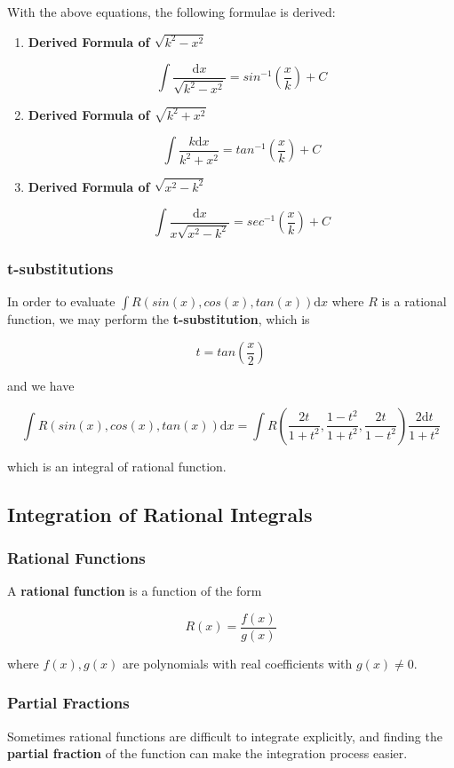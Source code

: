 \documentclass[a4paper,12pt]{article}
\newcommand{\s}{\vspace{1mm}}
\newcommand{\n}{\vspace{3mm}}
\newcommand{\diff}{\mathrm{d}}
\newenvironment{alist}{ %
\begin{enumerate}[label=(\alph*)]
}{
\end{enumerate}
}
\begin{document}
With the above equations, the following formulae is derived:

\begin{alist}
  \item \textbf{Derived Formula of $\sqrt{k^{2}-x^{2}}$}

  $$\int\frac{\diff x}{\sqrt{k^{2}-x^{2}}}=sin^{-1}(\frac{x}{k})+C$$

  \item \textbf{Derived Formula of $\sqrt{k^{2}+x^{2}}$}

  $$\int\frac{k\diff x}{k^{2}+x^{2}}=tan^{-1}(\frac{x}{k})+C$$

  \item \textbf{Derived Formula of $\sqrt{x^{2}-k^{2}}$}

  $$\int\frac{\diff x}{x\sqrt{x^{2}-k^{2}}}=sec^{-1}(\frac{x}{k})+C$$
\end{alist}

\subsubsection{t-substitutions}
In order to evaluate $\int R(sin(x),cos(x),tan(x))\diff x$ where $R$ is a rational function, we may perform the \textbf{t-substitution}, which is

$$t=tan\left( \frac{x}{2}\right)$$\s

and we have

$$\int R(sin(x),cos(x),tan(x))\diff x=\int R\left( \frac{2t}{1+t^{2}},\frac{1-t^{2}}{1+t^{2}},\frac{2t}{1-t^{2}}\right)\frac{2\diff t}{1+t^{2}}$$\s

which is an integral of rational function.

\subsection{Integration of Rational Integrals}
\subsubsection{Rational Functions}
A \textbf{rational function} is a function of the form

$$R(x)=\frac{f(x)}{g(x)}$$

where $f(x),g(x)$ are polynomials with real coefficients with $g(x)\neq 0$.

\subsubsection{Partial Fractions}
Sometimes rational functions are difficult to integrate explicitly, and finding the \textbf{partial fraction} of the function can make the integration process easier.\n
\end{document}
